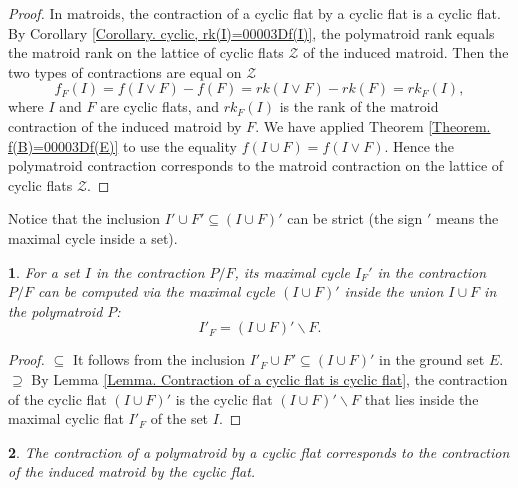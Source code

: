 \documentclass[11pt]{article}
\theoremstyle{plain}
\newtheorem{thm}{\protect\theoremname}[section]
\theoremstyle{definition}
\theoremstyle{remark}
\theoremstyle{plain}
\theoremstyle{plain}
\newtheorem{prop}[thm]{\protect\propositionname}
\theoremstyle{plain}
\theoremstyle{definition}
\providecommand{\propositionname}{Proposition}
\providecommand{\theoremname}{Theorem}
\begin{document}
\begin{proof}
In matroids, the contraction of a cyclic flat by a cyclic flat is
a cyclic flat. By Corollary \ref{Corollary. cyclic, rk(I)=00003Df(I)},
the polymatroid rank equals the matroid rank on the lattice of cyclic
flats $\mathcal{Z}$ of the induced matroid. Then the two types of
contractions are equal on $\mathcal{Z}$
\[
f_{F}(I)=f(I\vee F)-f(F)=rk(I\vee F)-rk(F)=rk_{F}(I),
\]
where $I$ and $F$ are cyclic flats, and $rk_{F}(I)$ is the rank
of the matroid contraction of the induced matroid by $F$. We have
applied Theorem \ref{Theorem. f(B)=00003Df(E)} to use the equality
$f(I\cup F)=f(I\vee F)$. Hence the polymatroid contraction corresponds
to the matroid contraction on the lattice of cyclic flats $\mathcal{Z}$.
\end{proof}
Notice that the inclusion $I'\cup F'\subseteq(I\cup F)'$ can be strict
(the sign $'$ means the maximal cycle inside a set).
\begin{prop}
\label{Proposition. Formula for the maximal cyclic in a contraction}For
a set $I$ in the contraction $P/F$, its maximal cycle $I_{F}'$
in the contraction $P/F$ can be computed via the maximal cycle $(I\cup F)'$
inside the union $I\cup F$ in the polymatroid $P$:
\[
I'_{F}=(I\cup F)'\backslash F.
\]
\end{prop}

\begin{proof}
$\boxed{\subseteq}$ It follows from the inclusion $I'_{F}\cup F'\subseteq(I\cup F)'$
in the ground set $E$. $\boxed{\supseteq}$ By Lemma \ref{Lemma. Contraction of a cyclic flat is cyclic flat},
the contraction of the cyclic flat $(I\cup F)'$ is the cyclic flat
$(I\cup F)'\backslash F$ that lies inside the maximal cyclic flat
$I'_{F}$ of the set $I$.
\end{proof}
\begin{thm}
\label{Theorem. Contraction by a cyclic flat}The contraction of a
polymatroid by a cyclic flat corresponds to the contraction of the
induced matroid by the cyclic flat.
\end{thm}
\end{document}
